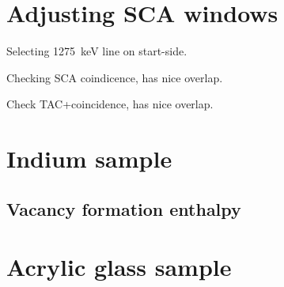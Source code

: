 \documentclass[11pt, english, fleqn, DIV=15, headinclude, BCOR=2cm]{scrreprt}
\begin{document}
\section{Adjusting SCA windows}

Selecting \SI{1275}{\kilo\electronvolt} line on start-side.

Checking SCA coindicence, has nice overlap.

Check TAC+coincidence, has nice overlap.

\section{Indium sample}

\subsection{Vacancy formation enthalpy}

\section{Acrylic glass sample}
\end{document}
